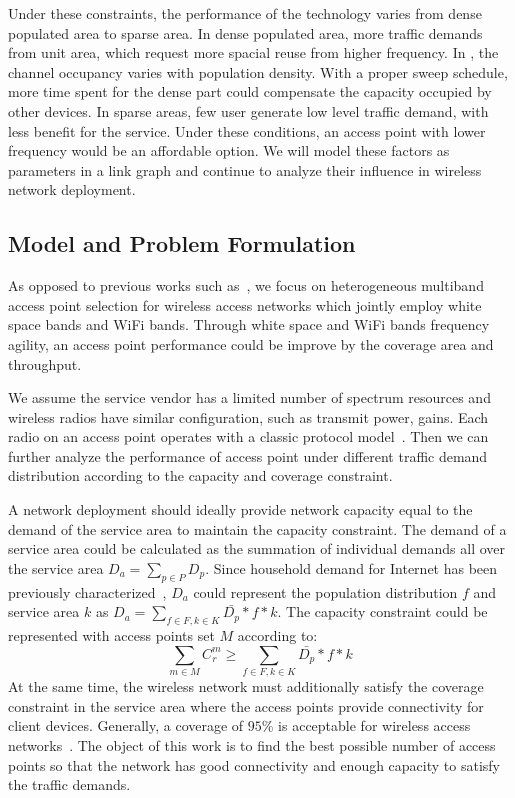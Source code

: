Under these constraints, the performance of the technology varies from dense 
populated area to sparse area. In dense populated area, more traffic demands
from unit area, which request more spacial reuse from higher frequency.
In \cite{cuimeasurement}, the channel occupancy varies with population density.
With a proper sweep schedule, more time spent for the dense part could 
compensate the capacity occupied by other devices. 
In sparse areas, few user generate low level traffic demand,
with less benefit for the service. Under these conditions, an access point
with lower frequency would be an affordable option. 
We will model these factors as parameters in a link graph 
and continue to analyze their influence in wireless network deployment.

\subsection{Model and Problem Formulation}
\label{subsec:problem}

As opposed to previous works such as~\cite{franklin2007node,robinson2010deploying
,si2010overview}, we focus on heterogeneous multiband access point selection 
for wireless access networks which jointly employ white space bands and WiFi bands.
Through white space and WiFi bands frequency agility, an access point performance could be
improve by the coverage area and throughput. 


We assume the service vendor has a limited number of spectrum resources and 
wireless radios have similar configuration, such as transmit power, 
gains. Each radio on an access point operates with a classic protocol 
model~\cite{gupta2000capacity}. Then we can further analyze the performance 
of access point under different traffic demand distribution according to the capacity 
and coverage constraint.

A network deployment should ideally provide network capacity equal to the demand of the service 
area to maintain the capacity constraint. The demand of a service area could be calculated as the 
summation of individual demands all over the service area $D_a=\sum_{p\in P}D_p$. Since 
household demand for Internet has been previously characterized~\cite{rosston2011household}, 
$D_a$ could represent the population distribution $f$ and service area $k$ as 
$D_a=\sum_{f \in F,k \in K}\bar{D_p}*f*k$. 
The capacity constraint could be represented with access points set $M$ according to:
\begin{equation}
\label{eq:nlbound}
\sum_{m \in M}C_r^m \ge \sum_{f \in F,k \in K}\bar{D_p}*f*k
\end{equation}
At the same time, the wireless network must additionally satisfy the coverage constraint in the service 
area where the access points provide connectivity for client devices. 
Generally, a coverage of $95\%$ is acceptable for wireless access networks~\cite{robinson2010deploying}.
The object of this work is to find the best possible number of access points so that the network has good 
connectivity and enough capacity to satisfy the traffic demands.

